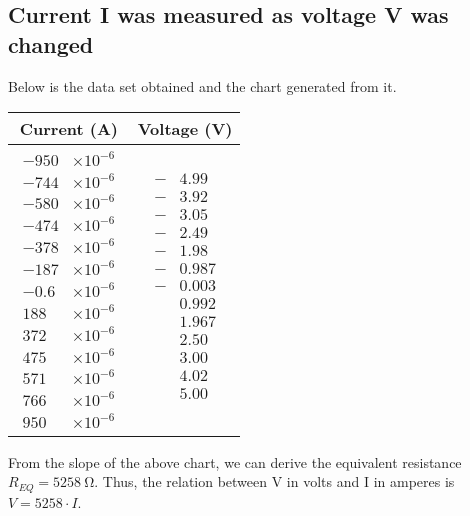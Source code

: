 \documentclass{article}
\begin{document}
\subsection{Current I was measured as voltage V was changed}
Below is the data set obtained and the chart generated from it.
\begin{center}
    \begin{tabular}{c c}
         \toprule
         Current (A) & Voltage (V)\\
         \midrule
         {$\!\begin{aligned}
             -950&\times 10^{-6} \\
             -744&\times 10^{-6} \\
             -580&\times 10^{-6} \\
             -474&\times 10^{-6} \\
             -378&\times 10^{-6} \\
             -187&\times 10^{-6} \\
             -0.6&\times 10^{-6} \\
             188&\times 10^{-6} \\
             372&\times 10^{-6} \\
             475&\times 10^{-6} \\
             571&\times 10^{-6} \\
             766&\times 10^{-6} \\
             950&\times 10^{-6} 
         \end{aligned}$} & {$\!\begin{aligned}
            -&4.99 \\
            -&3.92 \\
            -&3.05 \\
            -&2.49 \\
            -&1.98 \\
            -&0.987 \\
            -&0.003 \\
            &0.992 \\
            &1.967 \\
            &2.50 \\
            &3.00 \\
            &4.02 \\
            &5.00 \\
         \end{aligned}$}\\
         \bottomrule
    \end{tabular}
\end{center}
\begin{figure}[h]

\end{figure}
From the slope of the above chart, we can derive the equivalent resistance $R_{EQ} = \SI{5258}{\ohm}$. Thus, the relation between V in volts and I in amperes is $V = 5258\cdot I$.
\end{document}
